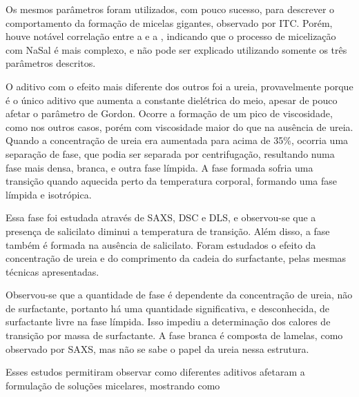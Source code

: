 		Os mesmos parâmetros foram utilizados, com pouco sucesso, para descrever o comportamento da formação de micelas gigantes, observado por ITC. Porém, houve notável correlação entre a \cmc{} e a \DHmic{}, indicando que o processo de micelização com NaSal é mais complexo, e não pode ser explicado utilizando somente os três parâmetros descritos.
		
		O aditivo com o efeito mais diferente dos outros foi a ureia, provavelmente porque é o único aditivo que aumenta a constante dielétrica do meio, apesar de pouco afetar o parâmetro de Gordon. Ocorre a formação de um pico de viscosidade, como nos outros casos, porém com viscosidade maior do que na ausência de ureia. Quando a concentração de ureia era aumentada para acima de 35\%, ocorria uma separação de fase, que podia ser separada por centrifugação, resultando numa fase mais densa, branca, e outra fase límpida. A fase formada sofria uma transição quando aquecida perto da temperatura corporal, formando uma fase límpida e isotrópica.
		
		Essa fase foi estudada através de SAXS, DSC e DLS, e observou-se que a presença de salicilato diminui a temperatura de transição. Além disso, a fase também é formada na ausência de salicilato. Foram estudados o efeito da concentração de ureia e do comprimento da cadeia do surfactante, pelas mesmas técnicas apresentadas.
		
		Observou-se que a quantidade de fase é dependente da concentração de ureia, não de surfactante, portanto há uma quantidade significativa, e desconhecida, de surfactante livre na fase límpida. Isso impediu a determinação dos calores de transição por massa de surfactante. A fase branca é composta de lamelas, como observado por SAXS, mas não se sabe o papel da ureia nessa estrutura.
		
		Esses estudos permitiram observar como diferentes aditivos afetaram a formulação de soluções micelares, mostrando como 

\FloatBarrier

